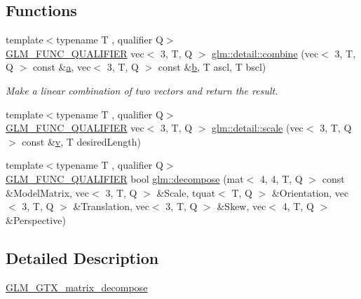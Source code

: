 \subsection*{Functions}
\begin{DoxyCompactItemize}
\item 
{\footnotesize template$<$typename T , qualifier Q$>$ }\\\hyperlink{setup_8hpp_a33fdea6f91c5f834105f7415e2a64407}{G\+L\+M\+\_\+\+F\+U\+N\+C\+\_\+\+Q\+U\+A\+L\+I\+F\+I\+ER} vec$<$ 3, T, Q $>$ \hyperlink{namespaceglm_1_1detail_a62c6df7a0862562560f4ff00b215f4e6}{glm\+::detail\+::combine} (vec$<$ 3, T, Q $>$ const \&\hyperlink{_s_d_l__opengl__glext_8h_a3309789fc188587d666cda5ece79cf82}{a}, vec$<$ 3, T, Q $>$ const \&\hyperlink{_s_d_l__opengl__glext_8h_a0f71581a41fd2264c8944126dabbd010}{b}, T ascl, T bscl)
\begin{DoxyCompactList}\small\item\em Make a linear combination of two vectors and return the result. \end{DoxyCompactList}\item 
{\footnotesize template$<$typename T , qualifier Q$>$ }\\\hyperlink{setup_8hpp_a33fdea6f91c5f834105f7415e2a64407}{G\+L\+M\+\_\+\+F\+U\+N\+C\+\_\+\+Q\+U\+A\+L\+I\+F\+I\+ER} vec$<$ 3, T, Q $>$ \hyperlink{namespaceglm_1_1detail_ab5e74c51452215027ae64d0ef1731f9c}{glm\+::detail\+::scale} (vec$<$ 3, T, Q $>$ const \&\hyperlink{_s_d_l__opengl_8h_a10a82eabcb59d2fcd74acee063775f90}{v}, T desired\+Length)
\item 
{\footnotesize template$<$typename T , qualifier Q$>$ }\\\hyperlink{setup_8hpp_a33fdea6f91c5f834105f7415e2a64407}{G\+L\+M\+\_\+\+F\+U\+N\+C\+\_\+\+Q\+U\+A\+L\+I\+F\+I\+ER} bool \hyperlink{group__gtx__matrix__decompose_ga91185463739c855d602596907a9994bc}{glm\+::decompose} (mat$<$ 4, 4, T, Q $>$ const \&Model\+Matrix, vec$<$ 3, T, Q $>$ \&Scale, tquat$<$ T, Q $>$ \&Orientation, vec$<$ 3, T, Q $>$ \&Translation, vec$<$ 3, T, Q $>$ \&Skew, vec$<$ 4, T, Q $>$ \&Perspective)
\end{DoxyCompactItemize}


\subsection{Detailed Description}
\hyperlink{group__gtx__matrix__decompose}{G\+L\+M\+\_\+\+G\+T\+X\+\_\+matrix\+\_\+decompose} 